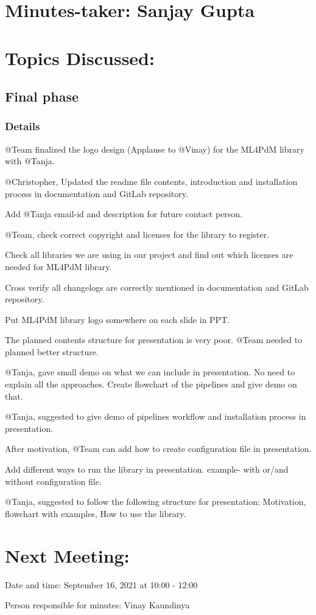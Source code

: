 \documentclass[11pt]{meetingmins} %
\begin{document}
\maketitle

\section{Minutes-taker: Sanjay Gupta}

\section{Topics Discussed:}

\subsection{Final phase}
\subsubsection{Details}
\begin{hiddensubitems}
    \item @Team finalized the logo design (Applause to @Vinay) for the ML4PdM library with @Tanja.
    \item @Christopher, Updated the readme file contents, introduction and installation process in documentation and GitLab repository.
    \item Add @Tanja email-id and description for future contact person.
    \item @Team, check correct copyright and licenses for the library to register.
    \item Check all libraries we are using in our project and find out which licenses are needed for ML4PdM library.
    \item Cross verify all changelogs are correctly mentioned in documentation and GitLab repository.
    \item Put ML4PdM library logo somewhere on each slide in PPT.
    \item The planned contents structure for presentation is very poor. @Team needed to planned better structure.
    \item @Tanja, gave small demo on what we can include in presentation. No need to explain all the approaches. Create flowchart of the pipelines and give demo on that.
    \item @Tanja, suggested to give demo of pipelines workflow and installation process in presentation.
    \item After motivation, @Team can add how to create configuration file in presentation.
    \item Add different ways to run the library in presentation. example- with or/and without configuration file.
    \item @Tanja, suggested to follow the following structure for presentation: Motivation, flowchart with examples, How to use the library.
\end{hiddensubitems}

\section{Next Meeting:}
\begin{hiddensubitems}
    \item Date and time: September 16, 2021 at 10:00 - 12:00
    \item Person responsible for minutes: Vinay Kaundinya
\end{hiddensubitems}
\end{document}

